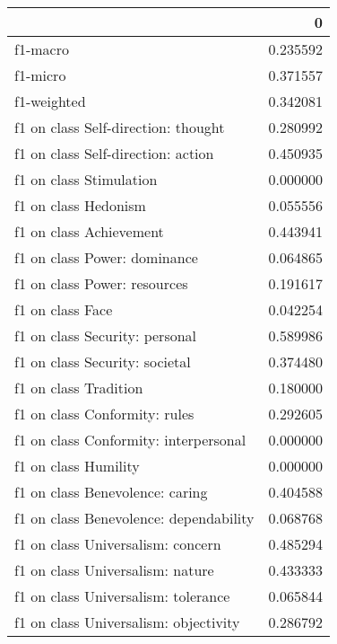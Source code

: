 \begin{tabular}{lr}
\toprule
{} &         0 \\
\midrule
f1-macro                               &  0.235592 \\
f1-micro                               &  0.371557 \\
f1-weighted                            &  0.342081 \\
f1 on class Self-direction: thought    &  0.280992 \\
f1 on class Self-direction: action     &  0.450935 \\
f1 on class Stimulation                &  0.000000 \\
f1 on class Hedonism                   &  0.055556 \\
f1 on class Achievement                &  0.443941 \\
f1 on class Power: dominance           &  0.064865 \\
f1 on class Power: resources           &  0.191617 \\
f1 on class Face                       &  0.042254 \\
f1 on class Security: personal         &  0.589986 \\
f1 on class Security: societal         &  0.374480 \\
f1 on class Tradition                  &  0.180000 \\
f1 on class Conformity: rules          &  0.292605 \\
f1 on class Conformity: interpersonal  &  0.000000 \\
f1 on class Humility                   &  0.000000 \\
f1 on class Benevolence: caring        &  0.404588 \\
f1 on class Benevolence: dependability &  0.068768 \\
f1 on class Universalism: concern      &  0.485294 \\
f1 on class Universalism: nature       &  0.433333 \\
f1 on class Universalism: tolerance    &  0.065844 \\
f1 on class Universalism: objectivity  &  0.286792 \\
\bottomrule
\end{tabular}
